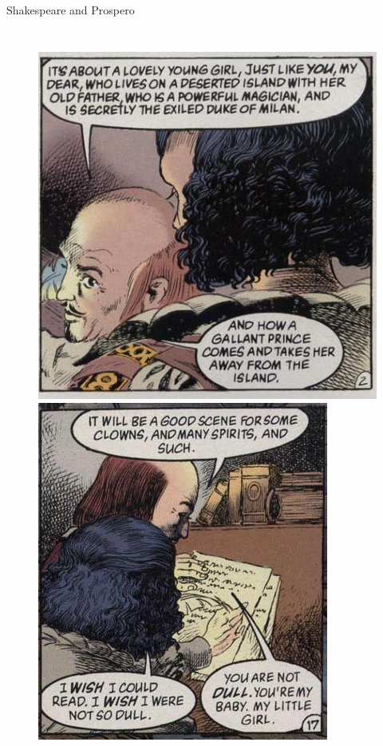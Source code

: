 \documentclass{beamer}
\begin{document}
  \begin{frame}{Shakespeare and Prospero}
    \begin{columns}[c]
      \begin{figure}[htp]
        \begin{center}
          \centering
          \includegraphics[scale=0.35]{../Presentation/judith.jpg}
          \includegraphics[scale=0.35]{../Presentation/judith2.jpg}
        \end{center}
      \end{figure}
      

\end{columns}
\end{frame}
\end{document}
